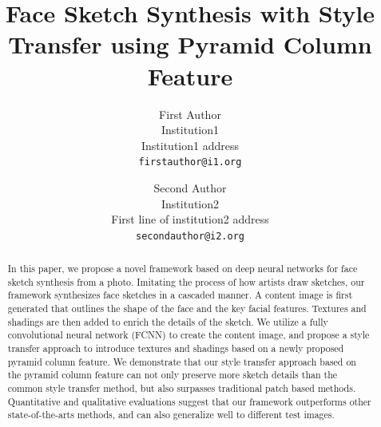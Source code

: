 \documentclass[10pt,twocolumn,letterpaper]{article}
\begin{document}
\title{Face Sketch Synthesis with Style Transfer using Pyramid Column Feature}

\author{First Author\\
Institution1\\
Institution1 address\\
{\tt\small firstauthor@i1.org}
\and
Second Author\\
Institution2\\
First line of institution2 address\\
{\tt\small secondauthor@i2.org}
}

\maketitle


\begin{abstract}

In this paper, we propose a novel framework based on deep neural networks for face sketch synthesis from a photo. Imitating the process of how artists draw sketches, our framework synthesizes face sketches in a cascaded manner. A content image is first generated that outlines the shape of the face and the key facial features. Textures and shadings are then added to enrich the details of the sketch. We utilize a fully convolutional neural network (FCNN) to create the content image, and propose a style transfer approach to introduce textures and shadings based on a newly proposed pyramid column feature. %
We demonstrate that our style transfer approach based on the pyramid column feature can not only preserve more sketch details than the common style transfer method, but also surpasses traditional patch based methods. Quantitative and qualitative evaluations suggest that our framework outperforms other state-of-the-arts methods, and can also generalize well to different test images.

\end{abstract}

\end{document}
